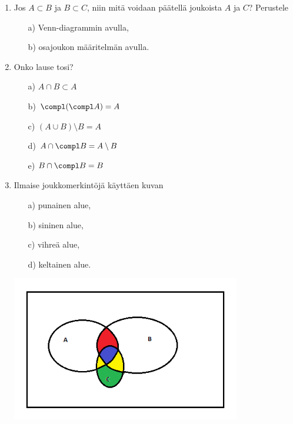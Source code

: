 \begin{enumerate}
\item Jos $A\subset B$ ja $B\subset C$, niin mitä voidaan päätellä joukoista $A$ ja $C$? Perustele 
\begin{itemize}
\item[a)] Venn-diagrammin avulla,
\item[b)] osajoukon määritelmän avulla.
\end{itemize}

\item
Onko lause tosi?
\begin{itemize}
\item[a)] $A \cap B \subset A$
\item[b)] $\compl (\compl A) = A$
\item[c)] $(A\cup B) \setminus B = A$
\item[d)] $A \cap \compl B = A \setminus B$
\item[e)] $B \cap \compl B = B$
\end{itemize}

\item Ilmaise joukkomerkintöjä käyttäen kuvan
\begin{itemize}
\item[a)] punainen alue,
\item[b)] sininen alue,
\item[c)] vihreä alue,
\item[d)] keltainen alue.
\end{itemize}

\begin{center}
\includegraphics[width=10cm]{kuvat/mika3}
\end{center}


\end{enumerate}
